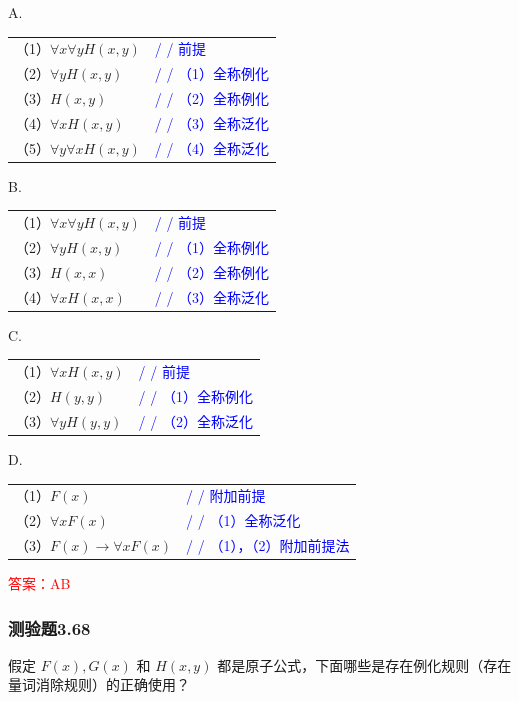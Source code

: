 \documentclass[UTF8, heading=true]{ctexart}
\begin{document}
A. 

\begin{tabular}{ll}
  （1）$\forall x \forall y H(x, y)$ & \textcolor{blue}{/ / 前提} \\
  （2）$\forall y H(x, y)$ & \textcolor{blue}{/ / （1）全称例化} \\
  （3）$H(x, y)$ & \textcolor{blue}{/ / （2）全称例化} \\
  （4）$\forall x H(x, y)$ & \textcolor{blue}{/ / （3）全称泛化} \\
  （5）$\forall y \forall x H(x, y)$ & \textcolor{blue}{/ / （4）全称泛化}
\end{tabular}


B.

\begin{tabular}{ll}
  （1）$\forall x \forall y H(x, y)$ & \textcolor{blue}{/ / 前提} \\
  （2）$\forall y H(x, y)$ & \textcolor{blue}{/ / （1）全称例化} \\
  （3）$H(x, x)$ & \textcolor{blue}{/ / （2）全称例化} \\
  （4）$\forall x H(x, x)$ & \textcolor{blue}{/ / （3）全称泛化}
\end{tabular}


C.

\begin{tabular}{ll}
  （1）$\forall x H(x, y)$ & \textcolor{blue}{/ / 前提} \\
  （2）$H(y, y)$ & \textcolor{blue}{/ / （1）全称例化} \\
  （3）$\forall y H(y, y)$ & \textcolor{blue}{/ / （2）全称泛化}
\end{tabular}


D.

\begin{tabular}{ll}
  （1）$F(x)$ & \textcolor{blue}{/ / 附加前提} \\
  （2）$\forall x F(x)$ & \textcolor{blue}{/ / （1）全称泛化} \\
  （3）$F(x) \rightarrow \forall x F(x)$ & \textcolor{blue}{/ / （1），（2）附加前提法}
\end{tabular}



\textcolor{red}{答案：AB}

\subsubsection{测验题3.68}

假定 $F(x), G(x)$ 和 $H(x, y)$ 都是原子公式，下面哪些是存在例化规则（存在量词消除规则）的正确使用？
\end{document}
